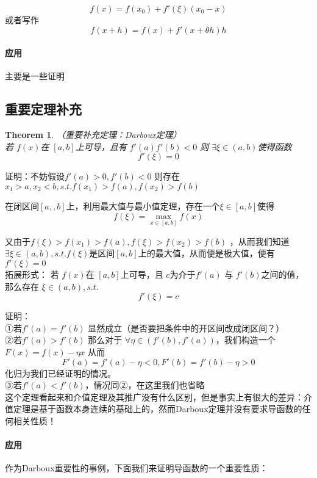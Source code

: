 \documentclass[11pt,hyperref,a4paper,UTF8]{ctexart}
\newtheorem{theorem}{Theorem}[subsection]
\begin{document}
\begin{CJK}{UTF8}{gkai}
\[f(x) = f(x_0) + f'(\xi) (x_0 - x)\]
或者写作
\[f(x + h) = f(x) + f'(x +\theta h) h\]

\paragraph{应用\\}
主要是一些证明
\subsection{重要定理补充}
\begin{theorem}（重要补充定理：Darboux定理）\\ 
若 $f(x)$在 $[a,b]$上可导，且有 $f'(a)f'(b) < 0 $ 则 $\exists \xi \in (a,b)$使得函数
\[f'(\xi) = 0\]
\end{theorem}
证明：不妨假设$f'(a) > 0, f'(b) < 0$ 则存在 $x_1 > a , x_2 < b , s.t. f(x_1) > f(a) , f(x_2) > f(b)$

在闭区间$[a,,b]$上，利用最大值与最小值定理，存在一个$\xi\in [a,b]$使得 
\[f(\xi) = \max_{x\in [a,b]}f(x)\]

又由于$f(\xi) > f(x_1) > f(a), f(\xi) > f(x_2) > f(b)$ ，从而我们知道$\exists \xi\in (a,b),s.t. f(\xi)$是区间$[a,b]$上的最大值，从而便是极大值，便有$f'(\xi) = 0$\\

拓展形式：
若 $f(x)$在 $[a,b]$上可导，且 $c$为介于$f'(a)$ 与 $f'(b)$之间的值，那么存在 $\xi \in (a,b),s.t.$
\[f'(\xi) = c\]

证明：\\
①若$f'(a) = f'(b)$ 显然成立（是否要把条件中的开区间改成闭区间？）\\
②若$f'(a) > f'(b)$ 那么对于 $\forall \eta\in (f'(b),f'(a))$，我们构造一个 $F(x) =  f(x) - \eta x$
从而
\[F'(a) = f'(a) - \eta < 0 , F'(b) = f'(b) - \eta > 0 \]
化归为我们已经证明的情况。\\
③若$f'(a) < f'(b)$，情况同②，在这里我们也省略\\


这个定理看起来和介值定理及其推广没有什么区别，但是事实上有很大的差异：介值定理是基于函数本身连续的基础上的，然而Darboux定理并没有要求导函数的任何相关性质！\\

\paragraph{应用\\} 
作为Darboux重要性的事例，下面我们来证明导函数的一个重要性质：\\


\end{CJK}
\end{document}
